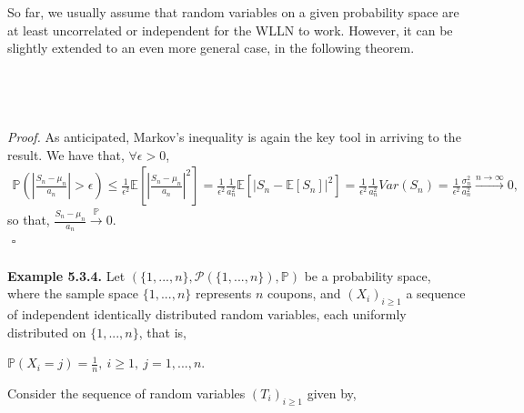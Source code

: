 \documentclass{article}
\begin{document}
So far, we usually assume that random variables on a given probability space are at least uncorrelated or independent for the WLLN to work. However, it can be slightly extended to an even more general case, in the following theorem.\\\\
\noindent{}\\\\\\
\textit{Proof.} As anticipated, Markov's inequality is again the key tool in arriving to the result. We have that, $\forall \epsilon > 0$,
\begin{eqnarray}
\nonumber
\mathbb{P}\left(\left|\frac{S_n - \mu_n}{a_n}\right| > \epsilon\right) \leq \frac{1}{\epsilon^2}\mathbb{E}\left[\left|\frac{S_n - \mu_n}{a_n}\right|^2\right] = \frac{1}{\epsilon^2}\frac{1}{a_n^2}\mathbb{E}\left[|S_n - \mathbb{E}[S_n]|^2\right] = \frac{1}{\epsilon^2}\frac{1}{a_n^2}Var(S_n) = \frac{1}{\epsilon^2}\frac{\sigma_n^2}{a_n^2} \xrightarrow{n\to\infty} 0,
\end{eqnarray}
so that, $\frac{S_n - \mu_n}{a_n} \xrightarrow{\mathbb{P}} 0$.\\
${}$ \hfill $\square$\\\\
\textbf{Example 5.3.4.} Let $(\{1,...,n\},\mathcal{P}(\{1,...,n\}),\mathbb{P})$ be a probability space, where the sample space $\{1,...,n\}$ represents $n$ coupons, and $(X_i)_{i\geq1}$ a sequence of independent identically distributed random variables, each uniformly distributed on $\{1,...,n\}$, that is,
\begin{center}
	$\mathbb{P}(X_i = j) = \frac{1}{n}, \ i\geq1, \ j = 1,...,n$.
\end{center}
Consider the sequence of random variables $(T_i)_{i\geq1}$ given by,
\end{document}
